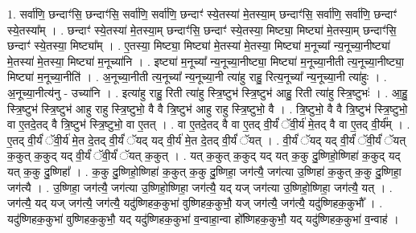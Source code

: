 \documentclass[17pt]{extarticle}
\begin{document}
1. सर्वा॑णि॒ छन्दाꣳ॑सि॒ छन्दाꣳ॑सि॒ सर्वा॑णि॒ सर्वा॑णि॒ छन्दाꣳ॑ स्ये॒तस्या॑ मे॒तस्या॒म् छन्दाꣳ॑सि॒ सर्वा॑णि॒ सर्वा॑णि॒ छन्दाꣳ॑ स्ये॒तस्या᳚म् । . छन्दाꣳ॑ स्ये॒तस्या॑ मे॒तस्या॒म् छन्दाꣳ॑सि॒ छन्दाꣳ॑ स्ये॒तस्या॒ मिष्ट्या॒ मिष्ट्या॑ मे॒तस्या॒म् छन्दाꣳ॑सि॒ छन्दाꣳ॑ स्ये॒तस्या॒ मिष्ट्या᳚म् । . ए॒तस्या॒ मिष्ट्या॒ मिष्ट्या॑ मे॒तस्या॑ मे॒तस्या॒ मिष्ट्या॑ म॒नूच्या᳚ न्य॒नूच्या॒नीष्ट्या॑ मे॒तस्या॑ मे॒तस्या॒ मिष्ट्या॑ म॒नूच्या॑नि । . इष्ट्या॑ म॒नूच्या᳚ न्य॒नूच्या॒नीष्ट्या॒ मिष्ट्या॑ म॒नूच्या॒नीती त्य॒नूच्या॒नीष्ट्या॒ मिष्ट्या॑ म॒नूच्या॒नीति॑ । . अ॒नूच्या॒नीती त्य॒नूच्या᳚ न्य॒नूच्या॒नी त्या॑हु राहु॒ रित्य॒नूच्या᳚ न्य॒नूच्या॒नी त्या॑हुः । . अ॒नूच्या॒नीत्य॑नु - उच्या॑नि । . इत्या॑हु राहु॒ रिती त्या॑हु स्त्रि॒ष्टुभ॑ स्त्रि॒ष्टुभ॑ आहु॒ रिती त्या॑हु स्त्रि॒ष्टुभः॑ । . आ॒हु॒ स्त्रि॒ष्टुभ॑ स्त्रि॒ष्टुभ॑ आहु राहु स्त्रि॒ष्टुभो॒ वै वै त्रि॒ष्टुभ॑ आहु राहु स्त्रि॒ष्टुभो॒ वै । . त्रि॒ष्टुभो॒ वै वै त्रि॒ष्टुभ॑ स्त्रि॒ष्टुभो॒ वा ए॒तदे॒तद् वै त्रि॒ष्टुभ॑ स्त्रि॒ष्टुभो॒ वा ए॒तत् । . वा ए॒तदे॒तद् वै वा ए॒तद् वी॒र्यं॑ ॅवी॒र्य॑ मे॒तद् वै वा ए॒तद् वी॒र्य᳚म् । . ए॒तद् वी॒र्यं॑ ॅवी॒र्य॑ मे॒त दे॒तद् वी॒र्यं॑ ॅयद् यद् वी॒र्य॑ मे॒त दे॒तद् वी॒र्यं॑ ॅयत् । . वी॒र्यं॑ ॅयद् यद् वी॒र्यं॑ ॅवी॒र्यं॑ ॅयत् क॒कुत् क॒कुद् यद् वी॒र्यं॑ ॅवी॒र्यं॑ ॅयत् क॒कुत् । . यत् क॒कुत् क॒कुद् यद् यत् क॒कु दु॒ष्णिहो॒ष्णिहा॑ क॒कुद् यद् यत् क॒कु दु॒ष्णिहा᳚ । . क॒कु दु॒ष्णिहो॒ष्णिहा॑ क॒कुत् क॒कु दु॒ष्णिहा॒ जग॑त्यै॒ जग॑त्या उ॒ष्णिहा॑ क॒कुत् क॒कु दु॒ष्णिहा॒ जग॑त्यै । . उ॒ष्णिहा॒ जग॑त्यै॒ जग॑त्या उ॒ष्णिहो॒ष्णिहा॒ जग॑त्यै॒ यद् यज् जग॑त्या उ॒ष्णिहो॒ष्णिहा॒ जग॑त्यै॒ यत् । . जग॑त्यै॒ यद् यज् जग॑त्यै॒ जग॑त्यै॒ यदु॑ष्णिहक॒कुभा॑ वुष्णिहक॒कुभौ॒ यज् जग॑त्यै॒ जग॑त्यै॒ यदु॑ष्णिहक॒कुभौ᳚ । . यदु॑ष्णिहक॒कुभा॑ वुष्णिहक॒कुभौ॒ यद् यदु॑ष्णिहक॒कुभा॑ व॒न्वाहा॒न्वा हो᳚ष्णिहक॒कुभौ॒ यद् 
यदु॑ष्णिहक॒कुभा॑ व॒न्वाह॑ । \newline
\end{document}
